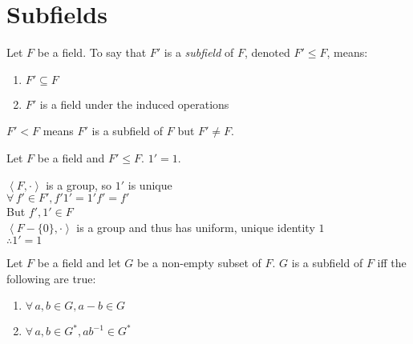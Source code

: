 \documentclass[letterpaper,12pt,fleqn]{article}
\newcommand{\group}[2]{\left<#1,#2\right>}
\begin{document}
\section*{Subfields}

\begin{definition}
  Let $F$ be a field. To say that $F'$ is a \emph{subfield} of $F$, denoted
  $F'\le F$, means:
  \begin{enumerate}
  \item $F'\subseteq F$
  \item $F'$ is a field under the induced operations
  \end{enumerate}

  $F'<F$ means $F'$ is a subfield of $F$ but $F'\ne F$.
\end{definition}

\begin{theorem}
  Let $F$ be a field and $F'\le F$. $1'=1$.
\end{theorem}

\begin{theproof}
  $\group{F}{\cdot}$ is a group, so $1'$ is unique \\
  $\forall\,f'\in F',f'1'=1'f'=f'$ \\
  But $f',1'\in F$ \\
  $\group{F-\{0\}}{\cdot}$ is a group and thus has uniform, unique
  identity $1$ \\
  $\therefore 1'=1$
\end{theproof}

\begin{theorem}
  Let $F$ be a field and let $G$ be a non-empty subset of $F$. $G$ is a subfield of $F$
  iff the following are true:
  \begin{enumerate}
  \item $\forall\,a,b\in G,a-b\in G$
  \item $\forall\,a,b\in G^*,ab^{-1}\in G^*$
  \end{enumerate}
\end{theorem}
\end{document}
